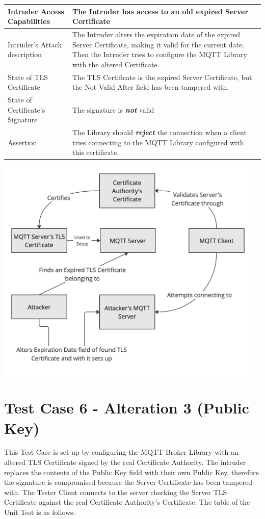 \documentclass[binding=0.6cm,noexaminfo]{sapthesis}
\begin{document}
\begin{center}
\begin{tabular}{| p{6cm} | p{6cm} |}
\hline
Intruder Access Capabilities & The Intruder has access to an old expired Server Certificate \\
\hline
Intruder’s Attack description & The Intruder alters the expiration date of the expired Server Certificate, making it valid for the current date. Then the Intruder tries  to configure the MQTT Library with the altered Certificate. \\
\hline
State of TLS Certificate & The TLS Certificate is the expired Server Certificate, but the Not Valid After field has been tampered with. \\
\hline
State of Certificate’s Signature & The signature is \textbf{\textit{not}} valid \\
\hline
Assertion & The Library should \textbf{\textit{reject}} the connection when a client tries connecting to the MQTT Library configured with this certificate. \\
\hline
\end{tabular}
\end{center}

\includegraphics[width=13cm]{TC5}

\section{Test Case 6 - Alteration 3 (Public Key)}
This Test Case is set up by configuring the MQTT Broker Library with an altered TLS Certificate signed by the real Certificate Authority. The intruder replaces the contents of the Public Key field with their own Public Key, therefore the signature is compromised because the Server Certificate has been tampered with. The Tester Client connects to the server checking the Server TLS Certificate against the real Certificate Authority’s Certificate. The table of the Unit Test is as follows:
\end{document}
